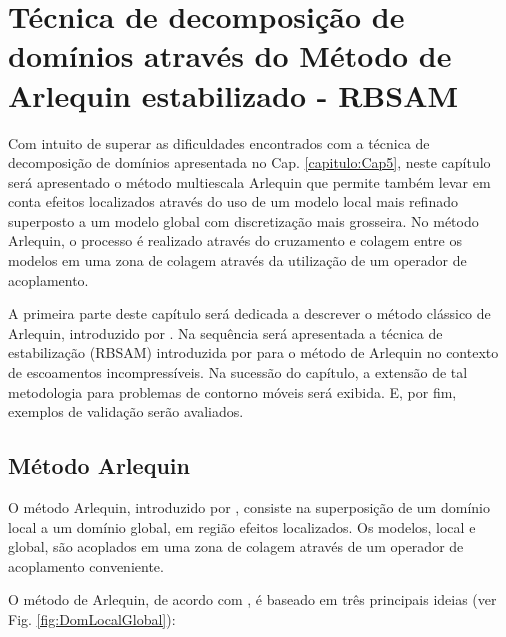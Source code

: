\documentclass[tese_patricia]{subfiles}
\begin{document}

\chapter[Método de Arlequin estabilizado]{Técnica de decomposição de domínios através do Método de Arlequin estabilizado - RBSAM} \label{capitulo:Cap6}

Com intuito de superar as dificuldades encontrados com a técnica de decomposição de domínios apresentada no Cap. \ref{capitulo:Cap5}, neste capítulo será apresentado o método multiescala Arlequin que permite também levar em conta efeitos localizados através do uso de um modelo local mais refinado superposto a um modelo global com discretização mais grosseira. No método Arlequin, o processo é realizado através do cruzamento e colagem entre os modelos em uma zona de colagem através da utilização de um operador de acoplamento.

A primeira parte deste capítulo será dedicada a descrever o método clássico de Arlequin, introduzido por . Na sequência será apresentada  a técnica de estabilização (RBSAM) introduzida por  para o método de Arlequin no contexto de escoamentos incompressíveis. Na sucessão do capítulo, a extensão de tal metodologia para problemas de contorno móveis será exibida. E, por fim, exemplos de validação serão avaliados.

\section{Método Arlequin}

O método Arlequin, introduzido por , consiste na superposição de um domínio local a um domínio global, em região efeitos localizados. Os modelos, local e global, são acoplados em uma zona de colagem através de um operador de acoplamento conveniente.

O  método de Arlequin, de acordo com , é baseado em três principais ideias (ver Fig. \ref{fig:DomLocalGlobal}):
\end{document}
